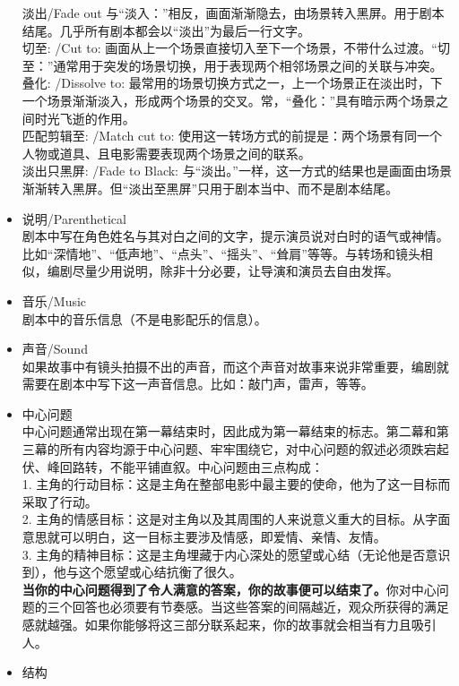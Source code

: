 \documentclass[UTF8,9pt]{ctexart}
\begin{document}
\begin{itemize}
    淡出/Fade out 与“淡入：”相反，画面渐渐隐去，由场景转入黑屏。用于剧本结尾。几乎所有剧本都会以“淡出”为最后一行文字。\\
    切至: /Cut to: 画面从上一个场景直接切入至下一个场景，不带什么过渡。“切至：”通常用于突发的场景切换，用于表现两个相邻场景之间的关联与冲突。\\
    叠化: /Dissolve to: 最常用的场景切换方式之一，上一个场景正在淡出时，下一个场景渐渐淡入，形成两个场景的交叉。常，“叠化：”具有暗示两个场景之间时光飞逝的作用。\\
    匹配剪辑至: /Match cut to: 使用这一转场方式的前提是：两个场景有同一个人物或道具、且电影需要表现两个场景之间的联系。\\
    淡出只黑屏: /Fade to Black: 与“淡出。”一样，这一方式的结果也是画面由场景渐渐转入黑屏。但“淡出至黑屏”只用于剧本当中、而不是剧本结尾。\\
\item 说明/Parenthetical\\
    剧本中写在角色姓名与其对白之间的文字，提示演员说对白时的语气或神情。比如“深情地”、“低声地”、“点头”、“摇头”、“耸肩”等等。与转场和镜头相似，编剧尽量少用说明，除非十分必要，让导演和演员去自由发挥。
\item 音乐/Music\\
    剧本中的音乐信息（不是电影配乐的信息）。
\item 声音/Sound\\
    如果故事中有镜头拍摄不出的声音，而这个声音对故事来说非常重要，编剧就需要在剧本中写下这一声音信息。比如：敲门声，雷声，等等。
\item 中心问题\\
    中心问题通常出现在第一幕结束时，因此成为第一幕结束的标志。第二幕和第三幕的所有内容均源于中心问题、牢牢围绕它，对中心问题的叙述必须跌宕起伏、峰回路转，不能平铺直叙。中心问题由三点构成：\\
    1. 主角的行动目标：这是主角在整部电影中最主要的使命，他为了这一目标而采取了行动。\\
    2. 主角的情感目标：这是对主角以及其周围的人来说意义重大的目标。从字面意思就可以明白，这一目标主要涉及情感，即爱情、亲情、友情。\\
    3. 主角的精神目标：这是主角埋藏于内心深处的愿望或心结（无论他是否意识到），他与这个愿望或心结抗衡了很久。\\
    {\bf 当你的中心问题得到了令人满意的答案，你的故事便可以结束了。}你对中心问题的三个回答也必须要有节奏感。当这些答案的间隔越近，观众所获得的满足感就越强。如果你能够将这三部分联系起来，你的故事就会相当有力且吸引人。
\item 结构\\

\end{itemize}
\end{document}
